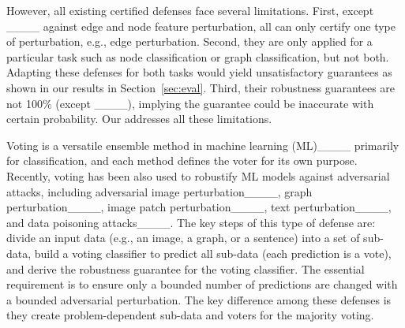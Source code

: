 However, all existing certified defenses face several  limitations. First, except ____ against edge and node feature perturbation, all can only 
certify 
one type of perturbation, e.g., edge perturbation. 
Second, they are only applied 
for a particular task such as node classification or graph classification, but not both. Adapting these defenses for both tasks would yield unsatisfactory guarantees as shown in our results in Section~\ref{sec:eval}. 
Third, their robustness guarantees are not 100\% (except ____), implying  the guarantee could be inaccurate with certain probability. Our {\name} addresses all these limitations. 



\vspace{+0.05in}
Voting is a versatile ensemble method in machine learning (ML)____ primarily for classification, and each method defines the voter for its own purpose. 
Recently, voting has been also used to robustify ML models against adversarial attacks, including adversarial image perturbation____,  graph perturbation____, image patch perturbation____, text perturbation____, and data poisoning attacks____.
The key steps of this type of defense are: divide an input data (e.g., an image, a graph, or a sentence) into a set of sub-data, build a voting classifier to predict all sub-data (each prediction is a vote), and derive the robustness guarantee for the voting classifier. 
The essential requirement is to ensure only a bounded number of predictions are changed with a bounded adversarial perturbation. 
The key difference among these defenses is they create problem-dependent sub-data and voters for the majority voting.